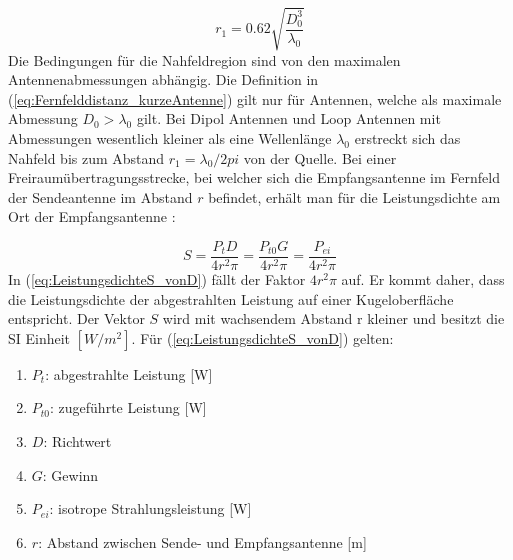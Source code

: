 \begin{equation}
r_{1}=0.62\sqrt{\dfrac{D_{0}^{3}}{\lambda_{0}}} \label{eq:Fernfelddistanz_kurzeAntenne}
\end{equation}
Die Bedingungen für die Nahfeldregion sind von den maximalen Antennenabmessungen abhängig. Die Definition in (\ref{eq:Fernfelddistanz_kurzeAntenne}) gilt nur für Antennen, welche als maximale Abmessung $D_{0}>\lambda_{0}$ gilt.
Bei Dipol Antennen und Loop Antennen mit Abmessungen wesentlich kleiner als eine Wellenlänge $\lambda_{0}$ erstreckt sich das Nahfeld bis zum Abstand $r_{1}=\lambda_{0}/2pi$ von der Quelle. Bei einer Freiraumübertragungsstrecke, bei welcher sich die Empfangsantenne im Fernfeld der Sendeantenne im Abstand $r$ befindet, erhält man für die Leistungsdichte am Ort der Empfangsantenne \cite{meinke1992taschenbuch}:

\begin{equation}
S=\dfrac{P_{t}D}{4r^{2}\pi} = \dfrac{P_{t0}G}{4r^{2}\pi}=\dfrac{P_{ei}}{4r^{2}\pi}\label{eq:LeistungsdichteS_vonD}
\end{equation}
In (\ref{eq:LeistungsdichteS_vonD}) fällt der Faktor $4r^{2}\pi$ auf. Er kommt daher, dass die Leistungsdichte der abgestrahlten Leistung auf einer Kugeloberfläche entspricht. Der Vektor $S$ wird mit wachsendem Abstand r kleiner und besitzt die SI Einheit $[W/m^{2}]$. Für (\ref {eq:LeistungsdichteS_vonD}) gelten:
\begin{enumerate}[leftmargin=2cm]
  \item[] $P_t$: abgestrahlte Leistung [W]
  \item[] $P_{t0}$: zugeführte Leistung [W]
	\item[] $D$: Richtwert 
  \item[] $G$: Gewinn 
  \item[] $P_{ei}$: isotrope Strahlungsleistung [W] 
  \item[] $r$: Abstand zwischen Sende- und Empfangsantenne [m]
\end{enumerate} 





